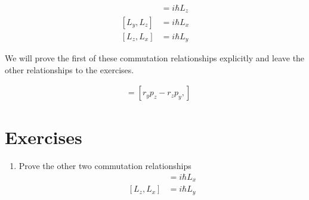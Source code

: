 \documentclass[book.tex]{subfiles}
\begin{document}
\begin{align}
    [L_x, L_y] &= i \hbar L_z \\
    [L_y, L_z] &= i \hbar L_x \\
    [L_z, L_x] &= i \hbar L_y
\end{align}

We will prove the first of these commutation relationships explicitly and leave the other relationships to the exercises.

\begin{align}
    [L_x, L_y] &= [r_y p_z - r_z p_y, ]
\end{align}

\section{Exercises}
\begin{enumerate}
    \item Prove the other two commutation relationships
    \begin{align}
    [L_y, L_z] &= i \hbar L_x \\
    [L_z, L_x] &= i \hbar L_y
    \end{align}
\end{enumerate}
\end{document}
